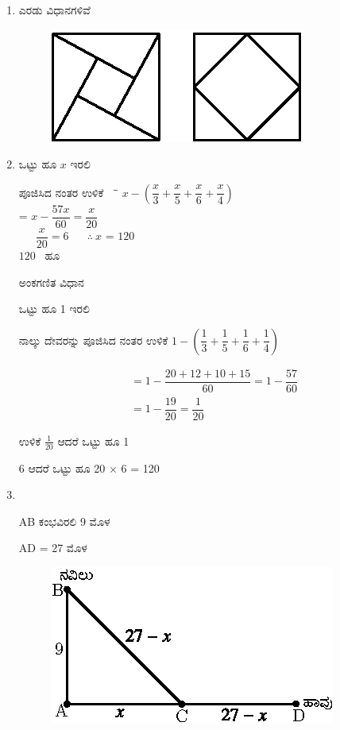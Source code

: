 \begin{enumerate}
\item ಎರಡು ವಿಧಾನಗಳಿವೆ

\begin{figure}[H]
\centering
\includegraphics{images/chap2/ans24.eps}
\end{figure}

\item ಒಟ್ಟು ಹೂ $x$ ಇರಲಿ 
\begin{tabbing}
ಪೂಜಿಸಿದ ನಂತರ ಉಳಿಕೆ ~~\= \quad \=  $x - \left(\dfrac{x}{3} + \dfrac{x}{5} + \dfrac{x}{6} + \dfrac{x}{4}\right)$\\[0.2cm]
\quad \> = \> $x - \dfrac{57x}{60} = \dfrac{x}{20}$\\
~~~\quad $\dfrac{x}{20} = 6$ ~ ~$\therefore~ x$ \> = \> $120$\\
\> \> $120$~ ಹೂ
\end{tabbing}

\smallskip
ಅಂಕಗಣಿತ ವಿಧಾನ 

ಒಟ್ಟು ಹೂ 1 ಇರಲಿ 

ನಾಲ್ಕು ದೇವರನ್ನು ಪೂಜಿಸಿದ ನಂತರ ಉಳಿಕೆ $1 - \left(\dfrac{1}{3} + \dfrac{1}{5} + \dfrac{1}{6} + \dfrac{1}{4}\right)$

\begin{align*}
& = 1 - \dfrac{20 + 12 + 10 + 15}{60} = 1 - \dfrac{57}{60}\\
& = 1 - \dfrac{19}{20} = \dfrac{1}{20}
\end{align*}

ಉಳಿಕೆ $\frac{1}{20}$ ಆದರೆ ಒಟ್ಟು ಹೂ 1

6 ಆದರೆ ಒಟ್ಟು ಹೂ 20 $\times$ 6 = 120

\item 
~
\begin{minipage}[t]{4cm}
AB ಕಂಭವಿರಲಿ 9 ಮೊಳ 

AD = 27 ಮೊಳ 
\end{minipage}
\begin{minipage}[t]{5cm}
\begin{figure}[H]
\centering
\includegraphics{images/chap2/ans26.eps}
\end{figure}
\end{minipage}


\end{enumerate}
